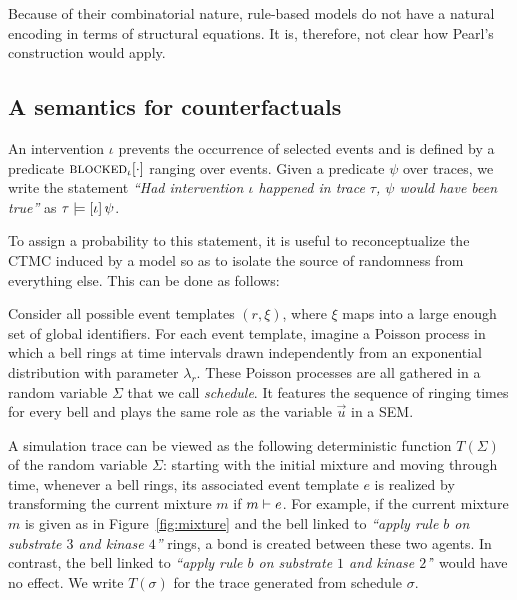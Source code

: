 Because of their combinatorial nature, rule-based models do not have a
natural encoding in terms of structural equations. It is, therefore,
not clear how Pearl's construction would apply.

\subsection{A semantics for counterfactuals}
\label{subsec:counterfactuals-semantics}

An intervention $\iota$ prevents the occurrence of selected events and
is defined by a predicate ${\textsc{blocked}}_{\iota}[\cdot]$ ranging over
events.   Given a predicate $\psi$ over traces, we write the
statement \textit{``Had intervention $\iota$ happened in trace $\tau$,
  $\psi$ would have been true''} as $\tau \models [\iota] \, \psi{}$.

To assign a probability to this statement, it is useful to
reconceptualize the CTMC induced by a model so as to isolate the
source of randomness from everything else. This can be done as
follows:
\begin{inparaenum}[(i)]
\item Consider all possible event templates $(r, \xi)$, where $\xi$
  maps into a large enough set of global identifiers. For each event
  template, imagine a Poisson process in which a bell rings at time
  intervals drawn independently from an exponential distribution with
  parameter $\lambda_r$. These Poisson processes are all gathered in a
  random variable $\Sigma$ that we call \emph{schedule}. It features
  the sequence of ringing times for every bell and plays the same role
  as the variable $\vec{u}$ in a SEM.
\item A simulation trace can be viewed as the following deterministic
  function $T(\Sigma)$ of the random variable $\Sigma$: starting with
  the initial mixture and moving through time, whenever a bell rings,
  its associated event template $e$ is realized by transforming the
  current mixture $m$ if $m \vdash e$. For example, if the
  current mixture $m$ is given as in Figure~\ref{fig:mixture} and the
  bell linked to \textit{``apply rule $b$ on substrate $3$ and kinase
    $4$''} rings, a bond is created between these two agents. In
  contrast, the bell linked to \textit{``apply rule $b$ on substrate
    $1$ and kinase $2$'}' would have no effect. We write $T(\sigma)$
  for the trace generated from schedule $\sigma$.
\end{inparaenum}

